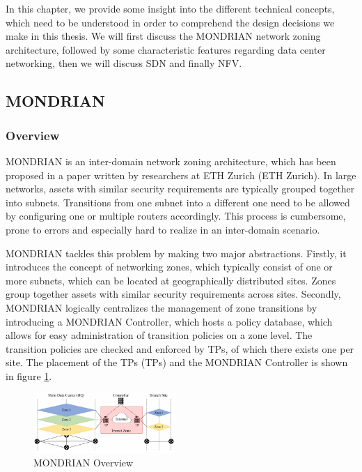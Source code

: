 In this chapter, we provide some insight into the different technical concepts, which need to be understood in order to comprehend the design decisions we make in this thesis. We will first discuss the MONDRIAN network zoning architecture, followed by some characteristic features regarding data center networking, then we will discuss \acl{SDN} and finally \acl{NFV}. 

\subsection{MONDRIAN}\label{sec:MONDRIAN}
\subsubsection{Overview}
MONDRIAN is an inter-domain network zoning architecture, which has been proposed in a paper \cite{kwonmondrian} written by researchers at \acs{ETH} Zurich (\acl{ETH} Zurich). In large networks, assets with similar security requirements are typically grouped together into subnets. Transitions from one subnet into a different one need to be allowed by configuring one or multiple routers accordingly. This process is cumbersome, prone to errors and especially hard to realize in an inter-domain scenario.

MONDRIAN tackles this problem by making two major abstractions. Firstly, it introduces the concept of networking zones, which typically consist of one or more subnets, which can be located at geographically distributed sites. Zones group together assets with similar security requirements across sites. Secondly, MONDRIAN logically centralizes the management of zone transitions by introducing a MONDRIAN Controller, which hosts a policy database, which allows for easy administration of transition policies on a zone level. The transition policies are checked and enforced by \aclp{TP}, of which there exists one per site. The placement of the \acsp{TP} (\aclp{TP}) and the MONDRIAN Controller is shown in figure \ref{MONDRIAN Overview}.  

\begin{figure}[t]
	\centering
	\includegraphics[width =0.48\textwidth]{img/mondrian_overview.png}
	\caption{MONDRIAN Overview\cite{kwonmondrian}}
	\label{MONDRIAN Overview}
\end{figure}

